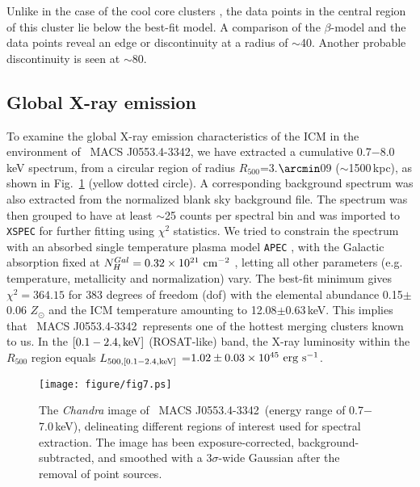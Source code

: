 \documentclass[useASM,usenatbib]{mn2e}
\newcommand{\mac}{\rm~MACS J0553.4-3342}
\begin{document}
Unlike in the case of the cool core clusters
\citep{2013Ap&SS.345..183P,2015Ap&SS.359...61S,2017MNRAS.466.2054V},
the data points in the central region of this cluster lie below the
best-fit model. A comparison of the $\beta$-model and the data points
reveal an edge or discontinuity at a radius of
$\sim$40\arcsec. Another probable discontinuity is seen at
$\sim$80\arcsec.


\subsection{Global X-ray emission}
\label{GXP}
To examine the global X-ray emission characteristics of the ICM in the
environment of \mac, we have extracted a cumulative 0.7$-$8.0 keV
spectrum, from a circular region of radius $R_{500}$=3.$\arcmin$09
($\sim$1500\,kpc), as shown in Fig.~\ref{fig5} (yellow dotted
circle). A corresponding background spectrum was also extracted from
the normalized blank sky background file. The spectrum was then
grouped to have at least $\sim$25 counts per spectral bin and was
imported to {\tt XSPEC} for further fitting using $\chi^2$ statistics.
We tried to constrain the spectrum with an absorbed single
temperature plasma model {\tt APEC} \citep{2001ApJ...556L..91S}, with
the Galactic absorption fixed at $N_{H}^{Gal} =
0.32\times10^{21}{\rm~cm^{-2}}$ \citep{1990ARA&A..28..215D}, 
letting all other parameters (e.g. temperature, metallicity and
normalization) vary. The best-fit minimum gives
$\chi^2=364.15$ for $383$ degrees of freedom (dof) with the elemental
abundance 0.15$\pm$ 0.06 $Z_{\odot}$ and the ICM temperature
amounting to 12.08$\pm$0.63\,keV. This implies that \mac\ represents one of the
hottest merging clusters known to us. In the $[0.1-2.4\rm,keV]$ (ROSAT-like)
band, the X-ray luminosity within the $R_{500}$ region equals
$L_{500,[0.1-2.4\rm,keV]}$ =$1.02\pm0.03\times10^{45} {~\rm
  erg~s^{-1}}$.
\begin{figure}
\texttt{[image: figure/fig7.ps]}
\caption{ The {\it Chandra} image of \mac\ (energy range of
  0.7$-$7.0\,keV), delineating different regions of interest used for
  spectral extraction. The image has been exposure-corrected,
  background-subtracted, and smoothed with a 3$\sigma$-wide Gaussian
  after the removal of point sources.}
\label{fig5}
\end{figure}
\end{document}
